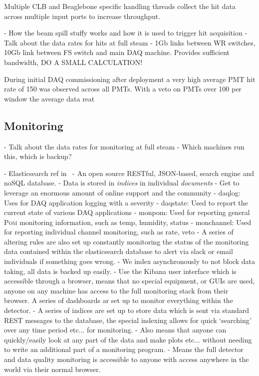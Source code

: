 Multiple CLB and Beaglebone specific handling
threads collect the hit data across multiple input ports to increase throughput. 



- How the beam spill stuffy works and how it is used to trigger hit acquisition
- Talk about the data rates for hits at full steam
- 1Gb links between WR switches, 10Gb link between FS switch and main DAQ machine. Provides
sufficient bandwidth, DO A SMALL CALCULATION!

During initial \chipsfive DAQ commissioning after deployment a very high average PMT hit rate of
\unit{150}{} was observed across all PMTs. With a veto on PMTs over
\unit{100}{} per window the average data reat

\subsection{Monitoring} %
\label{sec:daq_soft_monitor} %

- Talk about the data rates for monitoring at full steam
- Which machines run this, which is backup?

- Elasticsearch ref in~\cite{elastic2020}
- An open source RESTful, JSON-based, search engine and noSQL database.
- Data is stored in \emph{indices} in individual \emph{documents}
- Get to leverage an enormous amount of online support and the community
- daqlog: Uses for DAQ application logging with a severity
- daqstate: Used to report the current state of various DAQ applications
- monpom: Used for reporting general \textsc{Pom} monitoring information, such as temp, humidity, status
- monchannel: Used for reporting individual channel monitoring, such as rate, veto
- A series of altering rules are also set up constantly monitoring the status of the monitoring
data contained within the elasticsearch database to alert via slack or email individuals if something goes wrong.
- We index asynchronously to not block data taking, all data is backed up easily.
- Use the Kibana user interface which is accessible through a browser, means that no special
equipment, or GUIs are used, anyone on any machine has access to the full monitoring stack from
their browser. A series of dashboards ar set up to monitor everything within the detector.
- A series of indices are set up to store data which is sent via standard REST messages to the
database, the special indexing allows for quick `searching' over any time period etc... for
monitoring.
- Also means that anyone can quickly/easily look at any part of the data and make plots etc...
without needing to write an additional part of a monitoring program.
- Means the full detector and data quality monitoring is accessible to anyone with access anywhere
in the world via their normal browser.

